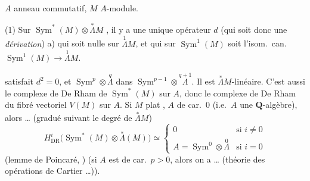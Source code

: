 \documentclass[11pt,a4paper]{article}
\begin{document}
$A$ anneau commutatif, $M$ $A$-module. 

(1) Sur $\operatorname{Sym}^*(M) \otimes \overset{*}{\Lambda} M$ , il y a une  unique opérateur $d$  (qui soit donc une \emph{dérivation})  a) qui soit nulle sur $\overset{1}{\Lambda} M$, et qui sur $\operatorname{Sym}^1(M)$ soit l'isom.\ can.\ $\operatorname{Sym}^1(M) \to \overset{1}{\Lambda} M$.

 satisfait $d^2 = 0$, et  $\operatorname{Sym}^p \otimes \overset{q}{\Lambda}$ dans $\operatorname{Sym}^{p-1} \otimes \overset{q+1}{\Lambda}$. Il est $\overset{*}{\Lambda} M$-linéaire. \struck{\ill{}} C'est aussi le complexe de De Rham de $\operatorname{Sym}^*(M)$ sur $A$, donc le complexe de De Rham du fibré vectoriel $V(M)$ sur $A$.  Si  $M$ plat , $A$ de car.\ $0$ (i.e.\ $A$ une $\mathbf{Q}$-algèbre), alors
 …
(gradué suivant le degré de $\overset{*}{\Lambda} M$)
\[
  H^i_{\mathrm{DR}}\bigl( \operatorname{Sym}^*(M) \otimes \overset{*}{\Lambda}(M) \bigr) \simeq
  \begin{cases}
    0 & \text{si } i \neq 0 \\
    A = \operatorname{Sym}^0 \otimes \overset{0}{\Lambda} & \text{si } i = 0
  \end{cases}
\]
(lemme de Poincaré, ) (si $A$ est de car.\ $p > 0$, alors on a … (théorie des opérations de Cartier …)).
\end{document}

